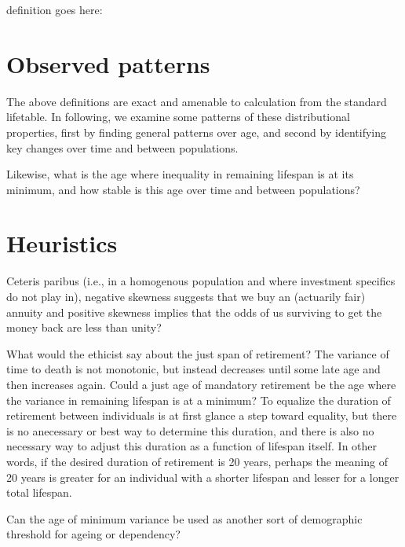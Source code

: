 \documentclass{article}
\begin{document}
definition goes here:

\section{Observed patterns}
The above definitions are exact and amenable to calculation from the standard
lifetable. In following, we examine some patterns of these distributional
properties, first by finding general patterns over age, and second by
identifying key changes over time and between populations.

Likewise, what is the age where inequality in remaining lifespan is at its
minimum, and how stable is this age over time and between populations?

\section{Heuristics}
Ceteris paribus (i.e., in a homogenous population and where investment
specifics do not play in), negative skewness suggests that we buy an (actuarily
fair) annuity and positive skewness implies that the odds of us surviving to get 
the money back are less than unity?

What would the ethicist say about the just span of retirement? The variance of
time to death is not monotonic, but instead decreases until some late age and
then increases again. Could a just age of mandatory retirement be the age where
the variance in remaining lifespan is at a minimum? To equalize the duration of
retirement between individuals is at first glance a step toward equality, but
there is no anecessary or best way to determine this duration, and there is also
no necessary way to adjust this duration as a function of lifespan itself. In
other words, if the desired duration of retirement is 20 years, perhaps the
meaning of 20 years is greater for an individual with a shorter lifespan and
lesser for a longer total lifespan.

Can the age of minimum variance be used as another sort of demographic threshold
for ageing or dependency?


\end{document}
